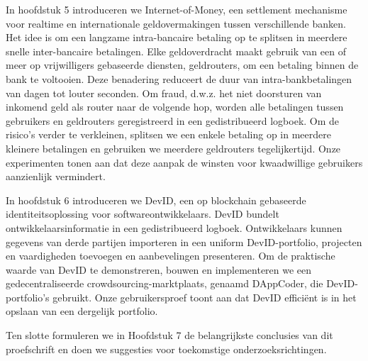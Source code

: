 {In hoofdstuk 5 introduceren we Internet-of-Money, een settlement mechanisme voor realtime en internationale geldovermakingen tussen verschillende banken.
Het idee is om een ​​langzame intra-bancaire betaling op te splitsen in meerdere snelle inter-bancaire betalingen.
Elke geldoverdracht maakt gebruik van een of meer op vrijwilligers gebaseerde diensten, geldrouters, om een ​​betaling binnen de bank te voltooien.
Deze benadering reduceert de duur van intra-bankbetalingen van dagen tot louter seconden.
Om fraud, d.w.z. het niet doorsturen van inkomend geld als router naar de volgende hop, worden alle betalingen tussen gebruikers en geldrouters geregistreerd in een gedistribueerd logboek.
Om de risico's verder te verkleinen, splitsen we een enkele betaling op in meerdere kleinere betalingen en gebruiken we meerdere geldrouters tegelijkertijd.
Onze experimenten tonen aan dat deze aanpak de winsten voor kwaadwillige gebruikers aanzienlijk vermindert.

In hoofdstuk 6 introduceren we DevID, een op blockchain gebaseerde identiteitsoplossing voor softwareontwikkelaars.
DevID bundelt ontwikkelaarsinformatie in een gedistribueerd logboek.
Ontwikkelaars kunnen gegevens van derde partijen importeren in een uniform DevID-portfolio, projecten en vaardigheden toevoegen en aanbevelingen presenteren.
Om de praktische waarde van DevID te demonstreren, bouwen en implementeren we een gedecentraliseerde crowdsourcing-marktplaats, genaamd DAppCoder, die DevID-portfolio's gebruikt.
Onze gebruikersproef toont aan dat DevID efficiënt is in het opslaan van een dergelijk portfolio.

Ten slotte formuleren we in Hoofdstuk 7 de belangrijkste conclusies van dit proefschrift en doen we suggesties voor toekomstige onderzoeksrichtingen.
}



